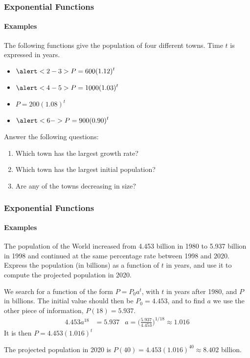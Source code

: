 \documentclass[9pt,xcolor=x11names,compress]{beamer}
\begin{document}
\begin{frame}
\frametitle{Exponential Functions}
\framesubtitle{Examples}
\begin{example}
The following functions give the population of four different towns.  Time $t$ is expressed in years.        
\begin{itemize}
    \item $\displaystyle{\alert<2-3>{P=600(1.12)^t}}$
    \item $\displaystyle{\alert<4-5>{P=1000(1.03)^t}}$
    \item $\displaystyle{P=200(1.08)^t}$
    \item $\displaystyle{\alert<6->{P=900(0.90)^t}}$
\end{itemize}
Answer the following questions:
\begin{enumerate}
    \item \alert<2-3>{Which town has the largest growth rate?} 
    \item \alert<4-5>{Which town has the largest initial population?} 
    \item \alert<6->{Are any of the towns decreasing in size?} 
\end{enumerate}
\end{example}    
\end{frame}

\begin{frame}\frametitle{Exponential Functions}
   \framesubtitle{Examples}
   \begin{example}
    The population of the World increased from 4.453 billion in 1980 to 5.937 billion in 1998 and continued at the same percentage rate between 1998 and 2020.  Express the population (in billions) as a function of $t$ in years, and use it to compute the projected population in 2020.  
    \end{example}
    \pause
    \alert<2>{We search for a function of the form $P=P_0a^t$, with $t$ in years after 1980, and $P$ in billions.}  \pause \alert<3>{The initial value should then be $P_0=4.453$, and to find $a$ we use the other piece of information, $P(18)=5.937$.}
    \pause
    \alert<4>{%
    \begin{align*}
       4.453a^{18}&=5.937 &a=\Big( \frac{5.937}{4.453} \Big)^{1/18}\approx 1.016
    \end{align*}}
    \pause
    \alert<5>{It is then $P=4.453(1.016)^t$}

    \pause
    \alert<6>{The projected population in 2020 is $P(40)=4.453(1.016)^{40} \approx 8.402$ billion.}
\end{frame}
\end{document}
